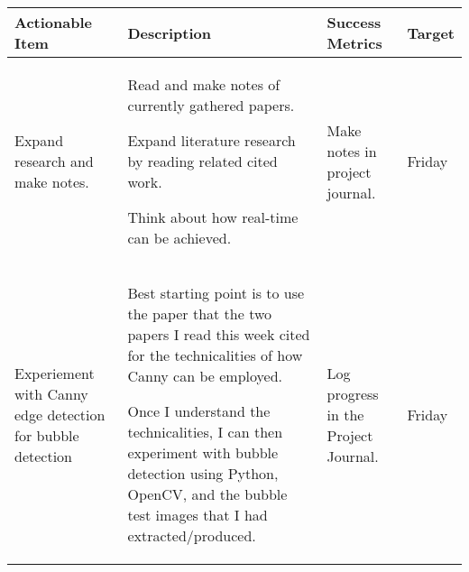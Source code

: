 \begin{table}[!h]
    \centering
    \begin{tabularx}{\textwidth}{|X|X|X|l|}
        \hline
        Actionable Item & Description & Success Metrics & Target \\
        \hline
        \hline
        Expand research and make notes. &
        \begin{myitemize}
            \item Read and make notes of currently gathered papers.
            \item Expand literature research by reading related cited work.
            \item Think about how real-time can be achieved.
        \end{myitemize} &
        \begin{myitemize}
            \item Make notes in project journal.
        \end{myitemize} &
        Friday \\
        \hline
        Experiement with Canny edge detection for bubble detection &
        \begin{myitemize}
            \item Best starting point is to use the paper that the two papers I read this week cited for the technicalities of how Canny can be employed.
            \item Once I understand the technicalities, I can then experiment with bubble detection using Python, OpenCV, and the bubble test images that I had extracted/produced.
        \end{myitemize} &
        \begin{myitemize}
            \item Log progress in the Project Journal.
        \end{myitemize} &
        Friday \\
        \hline
    \end{tabularx}
\end{table}
